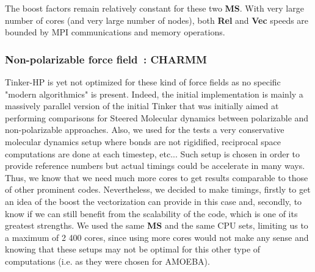 \documentclass[9pt,comparison]{livecoms}
\begin{document}
The boost factors remain relatively constant for these two \textbf{MS}. With very large number of cores (and very large number of nodes), both \textbf{Rel} and \textbf{Vec} speeds are bounded by MPI communications and memory operations. 
\subsubsection{Non-polarizable force field~: CHARMM}
\hspace{\parindent}Tinker-HP is yet not optimized for these kind of force fields as no specific "modern algorithmics" is present. Indeed, the initial implementation is mainly a massively parallel version of the initial Tinker that was initially aimed at performing comparisons for Steered Molecular dynamics between polarizable and non-polarizable approaches.\cite{SMD-Tinker} Also, we used for the tests a very conservative molecular dynamics setup where bonds are not rigidified, reciprocal space computations are done at each timestep, etc... Such setup is chosen in order to provide reference numbers but actual timings could be accelerate in many ways. Thus, we know that we need much more cores to get results comparable to those of other prominent codes\cite{GROMACS,NAMD,GENESIS}. Nevertheless, we decided to make timings, firstly to get an idea of the boost the vectorization can provide in this case and, secondly, to know if we can still benefit from the scalability of the code, which is one of its greatest strengths. We used the same \textbf{MS} and the same CPU sets, limiting us to a maximum of 2 400 cores, since using more cores  would not make any sense and knowing that these setups may not be optimal for this other type of computations (i.e. as they were chosen for AMOEBA). 
\end{document}
